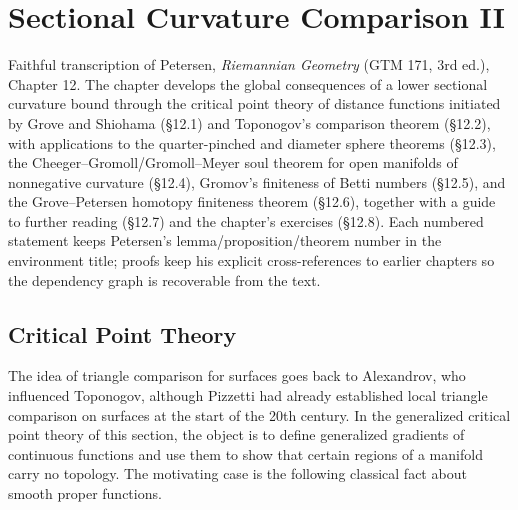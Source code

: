 \chapter{Sectional Curvature Comparison II}
\label{chap:pet-sectional-curvature-comparison-ii}

Faithful transcription of Petersen, \emph{Riemannian Geometry} (GTM 171, 3rd ed.),
Chapter 12. The chapter develops the global consequences of a lower sectional
curvature bound through the critical point theory of distance functions
initiated by Grove and Shiohama (§12.1) and Toponogov's comparison theorem
(§12.2), with applications to the quarter-pinched and diameter sphere theorems
(§12.3), the Cheeger--Gromoll/Gromoll--Meyer soul theorem for open manifolds of
nonnegative curvature (§12.4), Gromov's finiteness of Betti numbers (§12.5),
and the Grove--Petersen homotopy finiteness theorem (§12.6), together with a
guide to further reading (§12.7) and the chapter's exercises (§12.8). Each
numbered statement keeps Petersen's lemma/proposition/theorem number in the
environment title; proofs keep his explicit cross-references to earlier
chapters so the dependency graph is recoverable from the text.

\section{Critical Point Theory}

The idea of triangle comparison for surfaces goes back to Alexandrov, who
influenced Toponogov, although Pizzetti had already established local triangle
comparison on surfaces at the start of the 20th century. In the generalized
critical point theory of this section, the object is to define generalized
gradients of continuous functions and use them to show that certain regions of
a manifold carry no topology. The motivating case is the following classical
fact about smooth proper functions.

